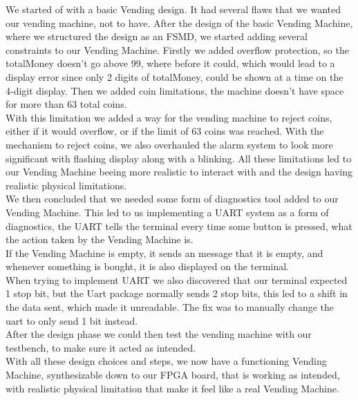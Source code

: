 
We started of with a basic Vending design. It had several flaws that we wanted our vending machine, not to have. After the design of the basic Vending Machine, where we structured the design as an FSMD, we started adding several constraints to our Vending Machine.  Firstly we added overflow protection, so the totalMoney doesn't go above 99, where before it could, which would lead to a display error since only 2 digits of totalMoney, could be shown at a time on the 4-digit display. Then we added coin limitations, the machine doesn't have space for more than 63 total coins. \\
With this limitation we added a way for the vending machine to reject coins, either if it would overflow, or if the limit of 63 coins was reached. With the mechanism to reject coins, we also overhauled the alarm system to look more significant with flashing display along with a blinking.
All these limitations led to our Vending Machine beeing more realistic to interact with and the design having realistic physical limitations.\\[0.1in]
We then concluded that we needed some form of diagnostics tool added to our Vending Machine. This led to us implementing a UART system as a form of diagnostics, the UART tells the terminal every time some button is pressed, what the action taken by the Vending Machine is.\\ 
If the Vending Machine is empty, it sends an message that it is empty, and whenever something is bought, it is also displayed on the terminal. \\
When trying to implement UART we also discovered that our terminal expected 1 stop bit, but the Uart package normally sends 2 stop bits, this led to a shift in the data sent, which made it unreadable. The fix was to manually change the uart to only send 1 bit instead.\\
After the design phase we could then test the vending machine with our testbench, to make sure it acted as intended. \\[0.1in]
With all these design choices and steps, we now have a functioning Vending Machine, synthesizable down to our FPGA board, that is working as intended, with realistic physical limitation that make it feel like a real Vending Machine.




